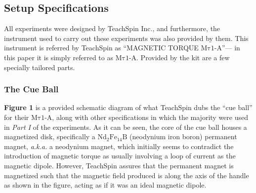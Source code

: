 \documentclass[12pt]{article}
\newcommand{\mtauonea}{\mathrm{M\tau1}\text{-}\mathrm{A}}
\begin{document}
\begin{multicols}{2}
\subsection{Setup Specifications}
All experiments were designed by TeachSpin Inc., and furthermore,
the instrument used to carry out these experiments was also provided by them.
This instrument is referred by TeachSpin as ``MAGNETIC TORQUE $\mtauonea$''---
in this paper it is simply referred to as $\mtauonea$.
Provided by the kit are a few specially tailored parts.

\subsubsection{The Cue Ball}
\textbf{Figure 1} is a provided schematic diagram of what TeachSpin dubs the ``cue ball'' for their $\mtauonea$,
along with other specifications in which the majority were used in \textit{Part I} of the experiments.
As it can be seen, the core of the cue ball houses a magnetized disk,
specifically a $\mathrm{Nd_2Fe_{14}B}$ (neodynium iron boron) permanent magnet,
\textit{a.k.a.} a neodynium magnet, which initially seems to contradict the
introduction of magnetic torque as usually involving a loop of current as the
magnetic dipole.
However, TeachSpin assures that the permanent magnet is magnetized such that the
magnetic field produced is along the axis of the handle as shown in the figure,
acting as if it was an ideal magnetic dipole.


\end{multicols}
\end{document}
